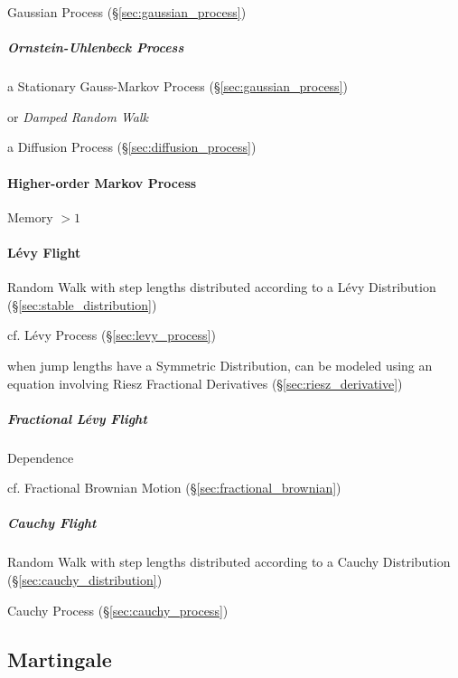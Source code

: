 Gaussian Process (\S\ref{sec:gaussian_process})



\subparagraph{Ornstein-Uhlenbeck Process}\label{sec:ornstein_uhlenbeck}\hfill

a Stationary Gauss-Markov Process (\S\ref{sec:gaussian_process})

or \emph{Damped Random Walk}

a Diffusion Process (\S\ref{sec:diffusion_process})



\paragraph{Higher-order Markov Process}\label{sec:higher_order_markov}\hfill

Memory $>1$



\paragraph{L\'evy Flight}\label{sec:levy_flight}\hfill

Random Walk with step lengths distributed according to a L\'evy Distribution
(\S\ref{sec:stable_distribution})

\fist cf. L\'evy Process (\S\ref{sec:levy_process})

when jump lengths have a Symmetric Distribution, can be modeled using an
equation involving Riesz Fractional Derivatives (\S\ref{sec:riesz_derivative})



\subparagraph{Fractional L\'evy Flight}\label{sec:fractional_levy}\hfill

Dependence

\fist cf. Fractional Brownian Motion (\S\ref{sec:fractional_brownian})



\subparagraph{Cauchy Flight}\label{sec:cauchy_flight}\hfill

Random Walk with step lengths distributed according to a Cauchy Distribution
(\S\ref{sec:cauchy_distribution})

\fist Cauchy Process (\S\ref{sec:cauchy_process})



\subsection{Martingale}\label{sec:martingale}

